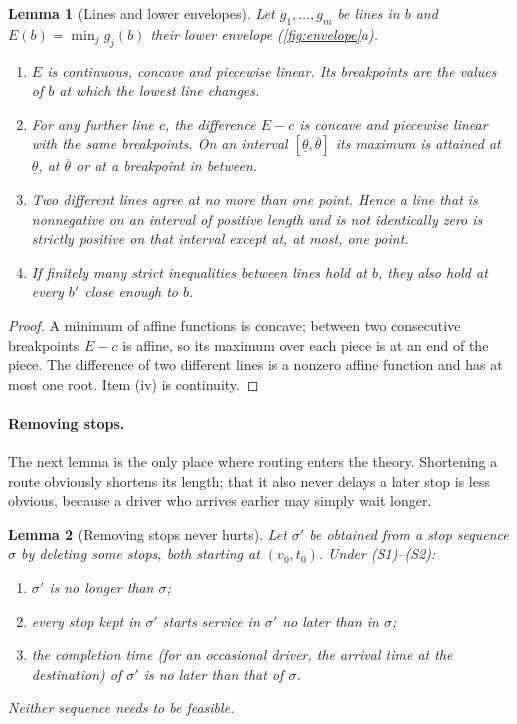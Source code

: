 \documentclass[11pt]{article}
\newtheorem{plemma}{Lemma}
\theoremstyle{definition}
\theoremstyle{remark}
\newcommand{\thl}{\underline{\theta}}
\newcommand{\thu}{\overline{\theta}}
\begin{document}
\begin{plemma}[Lines and lower envelopes]\label{lem:lines}
Let $g_1,\dots,g_m$ be lines in $b$ and $E(b)=\min_j g_j(b)$ their lower
envelope (\cref{fig:envelope}a).
\begin{enumerate}[label=(\roman*), itemsep=1pt]
\item $E$ is continuous, concave and piecewise linear. Its \emph{breakpoints}
are the values of $b$ at which the lowest line changes.
\item For any further line $c$, the difference $E-c$ is concave and piecewise
linear with the same breakpoints. On an interval $[\thl,\thu]$ its maximum is
attained at $\thl$, at $\thu$ or at a breakpoint in between.
\item Two different lines agree at no more than one point. Hence a line that is
nonnegative on an interval of positive length and is not identically zero is
strictly positive on that interval except at, at most, one point.
\item If finitely many strict inequalities between lines hold at $b$, they
also hold at every $b'$ close enough to $b$.
\end{enumerate}
\end{plemma}

\begin{proof}
A minimum of affine functions is concave; between two consecutive breakpoints
$E-c$ is affine, so its maximum over each piece is at an end of the piece. The
difference of two different lines is a nonzero affine function and has at most
one root. Item (iv) is continuity.
\end{proof}

\paragraph{Removing stops.}
The next lemma is the only place where routing enters the theory. Shortening a
route obviously shortens its length; that it also never delays a later stop is
less obvious, because a driver who arrives earlier may simply wait longer.

\begin{plemma}[Removing stops never hurts]\label{lem:remove}
Let $\sigma'$ be obtained from a stop sequence $\sigma$ by deleting some
stops, both starting at $(v_0,t_0)$. Under (S1)--(S2):
\begin{enumerate}[label=(\roman*), itemsep=1pt]
\item $\sigma'$ is no longer than $\sigma$;
\item every stop kept in $\sigma'$ starts service in $\sigma'$ no later than in
$\sigma$;
\item the completion time (for an occasional driver, the arrival time at the
destination) of $\sigma'$ is no later than that of $\sigma$.
\end{enumerate}
Neither sequence needs to be feasible.
\end{plemma}
\end{document}
